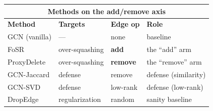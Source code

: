 \documentclass[border=14pt]{standalone}
\begin{document}
\small
\begin{tabular}{@{}llll@{}}
\multicolumn{4}{c}{\normalsize\textbf{Methods on the add/remove axis}}\\[5pt]
\toprule
\textbf{Method} & \textbf{Targets} & \textbf{Edge op} & \textbf{Role}\\
\midrule
GCN (vanilla)   & ---            & none            & baseline\\
FoSR            & over-squashing & \textbf{add}    & the ``add'' arm\\
ProxyDelete     & over-squashing & \textbf{remove} & the ``remove'' arm\\
GCN-Jaccard     & defense        & remove          & defense (similarity)\\
GCN-SVD         & defense        & low-rank        & defense (low-rank)\\
DropEdge        & regularization & random          & sanity baseline\\
\bottomrule
\end{tabular}
\end{document}
